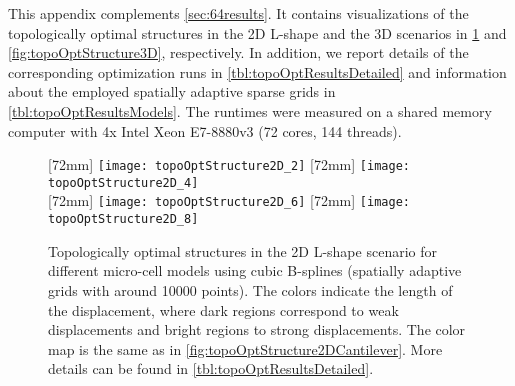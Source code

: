 \label{chap:a30topoOptDetails}

\noindent
This appendix complements \cref{sec:64results}.
It contains visualizations of the topologically optimal structures
in the 2D L-shape and the 3D scenarios in
\cref{fig:topoOptStructure2DLShape} and \cref{fig:topoOptStructure3D},
respectively.
In addition, we report details of the corresponding optimization runs
in \cref{tbl:topoOptResultsDetailed} and
information about the employed spatially adaptive sparse grids in
\cref{tbl:topoOptResultsModels}.
The runtimes were measured on a shared memory computer
with 4x Intel Xeon E7-8880v3 (72 cores, 144 threads).

\begin{figure}
  [72mm]{%
    \texttt{[image: topoOptStructure2D\_2]}%
  }%
  \hfill%
  [72mm]{%
    \texttt{[image: topoOptStructure2D\_4]}%
  }%
  \\[2mm]%
  [72mm]{%
    \texttt{[image: topoOptStructure2D\_6]}%
  }%
  \hfill%
  [72mm]{%
    \texttt{[image: topoOptStructure2D\_8]}%
  }%
  \caption[Optimal structures in the 2D L-shape scenario]{%
    Topologically optimal structures in the 2D L-shape scenario
    for different micro-cell models using cubic B-splines
    (spatially adaptive grids with around \num{10000} points).
    The colors indicate the length of the displacement,
    where dark regions correspond to weak displacements and
    bright regions to strong displacements.
    The color map is the same as in
    \cref{fig:topoOptStructure2DCantilever}.
    More details can be found in \cref{tbl:topoOptResultsDetailed}.%
  }%
  \label{fig:topoOptStructure2DLShape}%
\end{figure}

